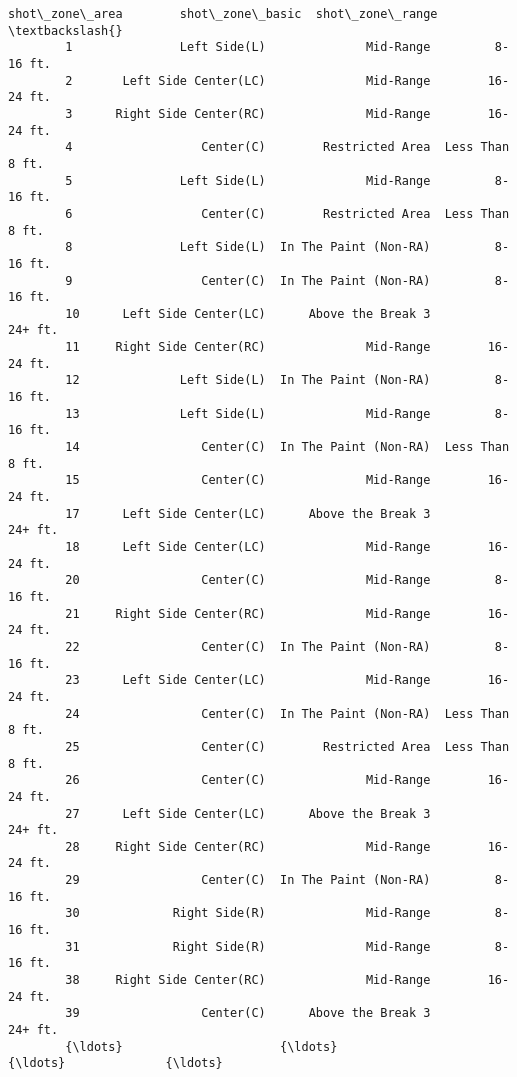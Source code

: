 \documentclass[11pt]{article}
\begin{document}
\begin{Verbatim}[commandchars=\\\{\}]
                      shot\_zone\_area        shot\_zone\_basic  shot\_zone\_range  \textbackslash{}
        1               Left Side(L)              Mid-Range         8-16 ft.   
        2       Left Side Center(LC)              Mid-Range        16-24 ft.   
        3      Right Side Center(RC)              Mid-Range        16-24 ft.   
        4                  Center(C)        Restricted Area  Less Than 8 ft.   
        5               Left Side(L)              Mid-Range         8-16 ft.   
        6                  Center(C)        Restricted Area  Less Than 8 ft.   
        8               Left Side(L)  In The Paint (Non-RA)         8-16 ft.   
        9                  Center(C)  In The Paint (Non-RA)         8-16 ft.   
        10      Left Side Center(LC)      Above the Break 3          24+ ft.   
        11     Right Side Center(RC)              Mid-Range        16-24 ft.   
        12              Left Side(L)  In The Paint (Non-RA)         8-16 ft.   
        13              Left Side(L)              Mid-Range         8-16 ft.   
        14                 Center(C)  In The Paint (Non-RA)  Less Than 8 ft.   
        15                 Center(C)              Mid-Range        16-24 ft.   
        17      Left Side Center(LC)      Above the Break 3          24+ ft.   
        18      Left Side Center(LC)              Mid-Range        16-24 ft.   
        20                 Center(C)              Mid-Range         8-16 ft.   
        21     Right Side Center(RC)              Mid-Range        16-24 ft.   
        22                 Center(C)  In The Paint (Non-RA)         8-16 ft.   
        23      Left Side Center(LC)              Mid-Range        16-24 ft.   
        24                 Center(C)  In The Paint (Non-RA)  Less Than 8 ft.   
        25                 Center(C)        Restricted Area  Less Than 8 ft.   
        26                 Center(C)              Mid-Range        16-24 ft.   
        27      Left Side Center(LC)      Above the Break 3          24+ ft.   
        28     Right Side Center(RC)              Mid-Range        16-24 ft.   
        29                 Center(C)  In The Paint (Non-RA)         8-16 ft.   
        30             Right Side(R)              Mid-Range         8-16 ft.   
        31             Right Side(R)              Mid-Range         8-16 ft.   
        38     Right Side Center(RC)              Mid-Range        16-24 ft.   
        39                 Center(C)      Above the Break 3          24+ ft.   
        {\ldots}                      {\ldots}                    {\ldots}              {\ldots}   

\end{Verbatim}
\end{document}
